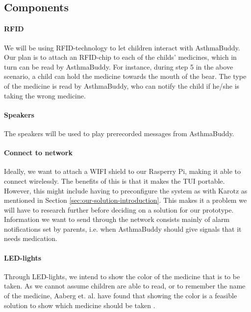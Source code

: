 \subsection{Components}

\paragraph{RFID}
We will be using RFID-technology to let children interact with AsthmaBuddy. Our plan is to attach an RFID-chip to each of the childs' medicines, which in turn can be read by AsthmaBuddy. For instance, during step 5 in the above scenario, a child can hold the medicine towards the mouth of the bear. The type of the medicine is read by AsthmaBuddy, who can notify the child if he/she is taking the wrong medicine. 

\paragraph{Speakers}
The speakers will be used to play prerecorded messages from AsthmaBuddy.

\paragraph{Connect to network}
Ideally, we want to attach a WIFI shield to our Rasperry Pi, making it able to connect wirelessly. The benefits of this is that it makes the TUI portable. However, this might include having to preconfigure the system as with Karotz as mentioned in Section \ref{sec:our-solution-introduction}. This makes it a problem we will have to research further before deciding on a solution for our prototype. Information we want to send through the network consists mainly of alarm notifications set by parents, i.e. when AsthmaBuddy should give signals that it needs medication. 

\paragraph{LED-lights}
Through LED-lights, we intend to show the color of the medicine that is to be taken. As we cannot assume children are able to read, or to remember the name of the medicine, Aaberg et. al. have found that showing the color is a feasible solution to show which medicine should be taken \cite{CustomerDriven}. 

